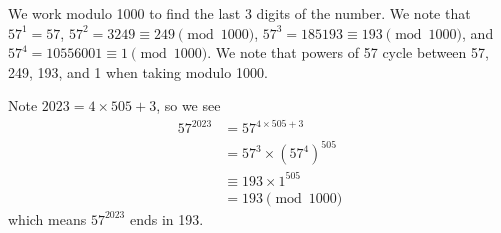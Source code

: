 \begin{questions}
    \item We work modulo 1000 to find the last 3 digits of the number. We note that $57^1 = 57$, $57^2 = 3249 \equiv 249 \pmod{1000}$, $57^3 = 185193 \equiv 193 \pmod{1000}$, and $57^4 = 10556001 \equiv 1 \pmod{1000}$. We note that powers of 57 cycle between 57, 249, 193, and 1 when taking modulo 1000.
    
    Note $2023 = 4\times505+3$, so we see
    \begin{align*}
        57^{2023} &= 57^{4\times505+3}\\
        &= 57^3 \times \left(57^4\right)^{505}\\
        &\equiv 193 \times 1^{505}\\
        &= 193 \pmod{1000}
    \end{align*}
    which means $57^{2023}$ ends in 193.
\end{questions}
